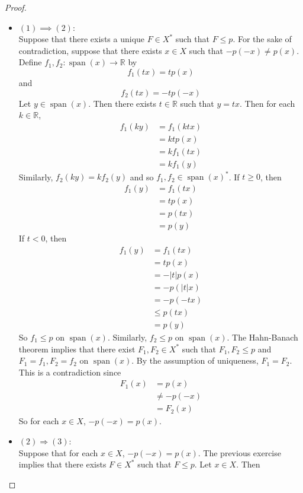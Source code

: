 \documentclass[12pt]{amsart}
\theoremstyle{definition}
\newcommand{\R}{\mathbb{R}}
\DeclareMathOperator{\spn}{span}
\begin{document}
	\begin{proof} \
		\begin{itemize}
			\item $(1) \implies (2)$: \\ 
			Suppose that there exists a unique $F \in X^*$ such that $F \leq p$. For the sake of contradiction, suppose that there exists $x \in X$ such that $-p(-x) \neq p(x)$. Define $f_1,f_2: \spn(x) \rightarrow \R$ by $$f_1(tx) = t p(x)$$ and $$f_2(tx) = -tp(-x)$$ Let $y \in \spn(x)$. Then there exists $t \in \R$ such that $y = tx$. Then for each $k \in \R$,
			\begin{align*}
				f_1(ky)
				&= f_1(ktx) \\
				&= ktp(x) \\
				&= k f_1(tx) \\
				&= k f_1(y)
			\end{align*}
			Similarly, $f_2(ky) = kf_2(y)$ and so $f_1, f_2 \in \spn(x)^*$. 
			If $t \geq 0$, then 
			\begin{align*}
				f_1(y) 
				&= f_1(tx) \\
				&= tp(x) \\
				&= p(tx) \\
				&= p(y) 
			\end{align*}
			If $t <0$, then 	
			\begin{align*}
				f_1(y) 
				&= f_1(tx) \\
				&= tp(x) \\
				&= -|t|p(x) \\
				&= -p(|t|x) \\
				&= -p(-tx) \\
				& \leq p(tx) \\
				&= p(y)  
			\end{align*}
			So $f_1 \leq p$ on $\spn(x)$. Similarly, $f_2 \leq p$ on $\spn(x)$. The Hahn-Banach theorem implies that there exist $F_1, F_2 \in X^*$ such that $F_1, F_2 \leq p$ and $F_1 = f_1, F_2 = f_2$ on $\spn(x)$. By the assumption of uniqueness, $F_1 = F_2$. This is a contradiction since 
			\begin{align*}
				F_1(x) 
				&= p(x) \\
				& \neq -p(-x) \\
				& = F_2(x) 
			\end{align*}		
			So for each $x \in X$, $-p(-x) = p(x)$. 
			\item $(2) \Rightarrow (3)$: \\
			Suppose that for each $x \in X$, $-p(-x) = p(x)$. The previous exercise implies that there exists $F \in X^*$ such that $F \leq p$. Let $x \in X$. Then 

\end{itemize}
\end{proof}
\end{document}
